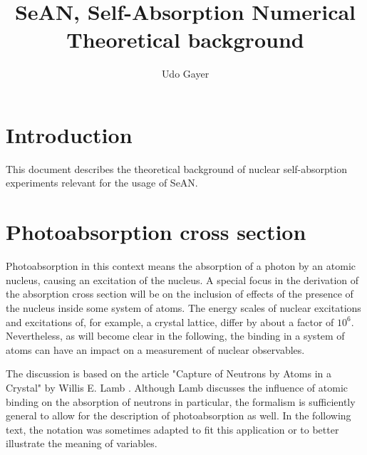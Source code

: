 \documentclass{article}
\begin{document}
\title{SeAN, Self-Absorption Numerical \\ Theoretical background}
\author{Udo Gayer}
\date{}
\maketitle

\newpage

\tableofcontents

\newpage

\section{Introduction}
This document describes the theoretical background of nuclear self-absorption experiments relevant for the usage of SeAN. 


\newpage

\section{Photoabsorption cross section}
Photoabsorption in this context means the absorption of a photon by an atomic nucleus, causing an excitation of the nucleus. A special focus in the derivation of the absorption cross section will be on the inclusion of effects of the presence of the nucleus inside some system of atoms. The energy scales of nuclear excitations and excitations of, for example, a crystal lattice, differ by about a factor of $10^6$. Nevertheless, as will become clear in the following, the binding in a system of atoms can have an impact on a measurement of nuclear observables.

The discussion is based on the article "Capture of Neutrons by Atoms in a Crystal" by Willis E. Lamb \cite{Lam39}. 
Although Lamb discusses the influence of atomic binding on the absorption of neutrons in particular, the formalism is sufficiently general to allow for the description of photoabsorption as well. In the following text, the notation was sometimes adapted to fit this application or to better illustrate the meaning of variables.
\end{document}
